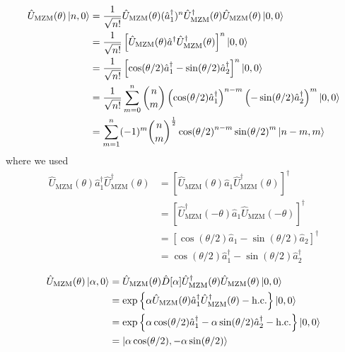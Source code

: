 \begin{equation}
	\begin{split}
		\hat{U}_\text{MZM}(\theta)
		\ket{n,0}
		&=
		\frac{1}{\sqrt{n!}}
		\hat{U}_\text{MZM}(\theta)
		(\hat{a}_1^\dagger)^n
		\hat{U}_\text{MZM}^\dagger(\theta)
		\hat{U}_\text{MZM}(\theta)
		\ket{0,0}
		\\
		&=
		\frac{1}{\sqrt{n!}}
		\left[
			\hat{U}_\text{MZM}(\theta)
			\hat{a}^\dagger
			\hat{U}_\text{MZM}^\dagger(\theta)
		\right]^n
		\ket{0,0}
		\\
		&=
		\frac{1}{\sqrt{n!}}
		\left[
			\cos(\theta/2)
			\hat{a}_1^\dagger
			-
			\sin(\theta/2)
			\hat{a}_2^\dagger
		\right]^n
		\ket{0,0}
		\\
		&=
		\frac{1}{\sqrt{n!}}
		\sum_{m=0}^n
		\binom{n}{m}
		\left(
			\cos(\theta/2)
			\hat{a}_1^\dagger
		\right)^{n-m}
		\left(
			-
			\sin(\theta/2)
			\hat{a}_2^\dagger
		\right)^m
		\ket{0,0}
		\\
		&=
		\sum_{m=1}^n
		(-1)^m
		\binom{n}{m}^\frac{1}{2}
		\cos(\theta/2)^{n-m}
		\sin(\theta/2)^m
		\ket{n-m,m}
	\end{split}
\end{equation}
where we used
\begin{equation}
	\begin{split}
		\hat{U}_\text{MZM}(\theta)
		\hat{a}_1^\dagger
		\hat{U}_\text{MZM}^\dagger(\theta)
		&=
		\left[
			\hat{U}_\text{MZM}(\theta)
			\hat{a}_1
			\hat{U}_\text{MZM}^\dagger(\theta)
		\right]^\dagger
		\\
		&=
		\left[
			\hat{U}_\text{MZM}^\dagger(-\theta)
			\hat{a}_1
			\hat{U}_\text{MZM}(-\theta)
		\right]^\dagger
		\\
		&=
		\left[
			\cos(\theta/2)
			\hat{a}_1
			-
			\sin(\theta/2)
			\hat{a}_2
		\right]^\dagger
		\\
		&=
		\cos(\theta/2)
		\hat{a}_1^\dagger
		-
		\sin(\theta/2)
		\hat{a}_2^\dagger
	\end{split}
\end{equation}

\begin{equation}
	\begin{split}
		\hat{U}_\text{MZM}(\theta)
		\ket{\alpha,0}
		&=
		\hat{U}_\text{MZM}(\theta)
		\hat{D}[\alpha]
		\hat{U}_\text{MZM}^\dagger(\theta)
		\hat{U}_\text{MZM}(\theta)
		\ket{0,0}
		\\
		&=
		\exp\left\{
			\alpha
			\hat{U}_\text{MZM}(\theta)
			\hat{a}_1^\dagger
			\hat{U}_\text{MZM}^\dagger(\theta)
			-
			\text{h.c.}
		\right\}
		\ket{0,0}
		\\
		&=
		\exp\left\{
			\alpha
			\cos(\theta/2)\hat{a}_1^\dagger
			-
			\alpha
			\sin(\theta/2)\hat{a}_2^\dagger
			-
			\text{h.c.}
		\right\}
		\ket{0,0}
		\\
		&=
		\ket{\alpha\cos(\theta/2),-\alpha\sin(\theta/2)}
	\end{split}
\end{equation}

